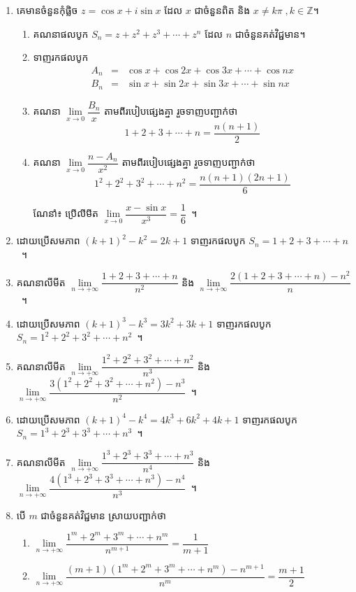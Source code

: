 \documentclass[a5paper,leqno,fleqn]{book}
\begin{document}
\begin{enumerate}
\begin{enumerate}
	\end{enumerate}
	\item គេមានចំនួនកុំផ្លិច $ z=\cos x+i\sin x $ ដែល $ x $ ជាចំនួនពិត និង $ x\neq k\pi\;,k\in\mathbb{Z} $។
	\begin{enumerate}
		\item គណនាផលបូក $ S_n=z+z^2+z^3+\cdots+z^n $ ដែល $ n $ ជាចំនួនគត់វិជ្ជមាន។
		\item ទាញរកផលបូក 
		\begin{eqnarray*}
		A_n&=&\cos x+\cos 2x+\cos 3x+\cdots+\cos nx\\
		B_n&=&\sin x+\sin 2x+\sin 3x+\cdots+\sin nx
		\end{eqnarray*}
		\item គណនា $ \lim\limits_{x\to 0}\dfrac{B_n}{x} $ តាមពីរបៀបផ្សេងគ្នា រួចទាញបញ្ជាក់ថា
		\[ 1+2+3+\cdots+n=\dfrac{n(n+1)}{2} \]
		\item គណនា $ \lim\limits_{x\to 0}\dfrac{n-A_n}{x^2} $ តាមពីរបៀបផ្សេងគ្នា រួចទាញបញ្ជាក់ថា
		\[ 1^2+2^2+3^2+\cdots+n^2=\dfrac{n(n+1)(2n+1)}{6} \]
		\item[ណែនាំ៖] ប្រើលីមីត $ \lim\limits_{x\to 0}\dfrac{x-\sin x}{x^3}=\dfrac{1}{6} $~។
	\end{enumerate}
	
	\item ដោយប្រើសមភាព $ (k+1)^2-k^2=2k+1 $ ទាញរកផលបូក $ S_n=1+2+3+\cdots+n $~។
	\item គណនាលីមីត $ \lim\limits_{n\to+\infty}\dfrac{1+2+3+\cdots+n}{n^2} $ និង $ \lim\limits_{n\to+\infty}\dfrac{2(1+2+3+\cdots+n)-n^2}{n} $~។
	\item ដោយប្រើសមភាព $ (k+1)^3-k^3=3k^2+3k+1 $ ទាញរកផលបូក $ S_n=1^2+2^2+3^2+\cdots+n^2 $~។
	\item គណនាលីមីត $ \lim\limits_{n\to+\infty}\dfrac{1^2+2^2+3^2+\cdots+n^2}{n^3} $ និង $ \lim\limits_{n\to+\infty}\dfrac{3(1^2+2^2+3^2+\cdots+n^2)-n^3}{n^2} $~។
	\item ដោយប្រើសមភាព $ (k+1)^4-k^4=4k^3+6k^2+4k+1 $ ទាញរកផលបូក $ S_n=1^3+2^3+3^3+\cdots+n^3 $~។
	\item គណនាលីមីត $ \lim\limits_{n\to+\infty}\dfrac{1^3+2^3+3^3+\cdots+n^3}{n^4} $ និង $ \lim\limits_{n\to+\infty}\dfrac{4(1^3+2^3+3^3+\cdots+n^3)-n^4}{n^3} $~។
	\item បើ $ m $ ជាចំនួនគត់វិជ្ជមាន ស្រាយបញ្ជាក់ថា
	\begin{enumerate}
		\item $ \lim\limits_{n\to +\infty}\dfrac{1^m+2^m+3^m+\cdots+n^m}{n^{m+1}}=\dfrac{1}{m+1} $
		\item $ \lim\limits_{n\to +\infty}\dfrac{(m+1)(1^m+2^m+3^m+\cdots+n^m)-n^{m+1}}{n^m}=\dfrac{m+1}{2} $
	\end{enumerate}
\end{enumerate}
\end{document}
